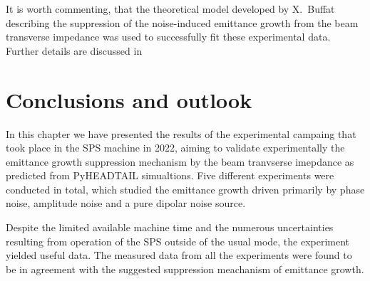 It is worth commenting, that the theoretical model developed by X.~Buffat~\cite{Buffat:2022dac} describing the suppression of the noise-induced emittance growth from the beam transverse impedance was used to successfully fit these experimental data. Further details are discussed in~\cite{van_kamper_presentation_xavier_theory}







\section{Conclusions and outlook}\label{sec:Ch8_conclusions}
In this chapter we have presented the results of the experimental campaing that took place in the SPS machine in 2022, aiming to validate experimentally the emittance growth suppression mechanism by the beam tranvserse imepdance as predicted from PyHEADTAIL simualtions. Five different experiments were conducted in total, which studied the emittance growth driven primarily by phase noise, amplitude noise and a pure dipolar noise source. 

Despite the limited available machine time and the numerous uncertainties resulting from operation of the SPS outside of the usual mode, the experiment yielded useful data. The measured data from all the experiments were found to be in agreement with the suggested suppression meachanism of emittance growth.

